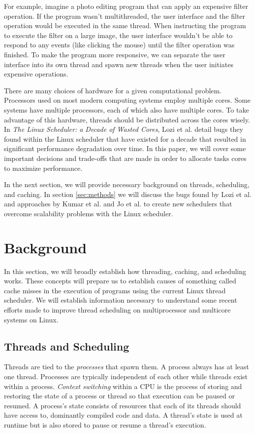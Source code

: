 \documentclass{sig-alternate}
\begin{document}
For example, imagine a photo editing program that can apply an expensive filter operation. If the program wasn't multithreaded, the user interface and the filter operation would be executed in the same thread. When instructing the program to execute the filter on a large image, the user interface wouldn't be able to respond to any events (like clicking the mouse) until the filter operation was finished. To make the program more responsive, we can separate the user interface into its own thread and spawn new threads when the user initiates expensive operations.

There are many choices of hardware for a given computational problem. Processors used on most modern computing systems employ multiple cores. Some systems have multiple processors, each of which also have multiple cores. To take advantage of this hardware, threads should be distributed across the cores wisely. In \emph{The Linux Scheduler: a Decade of Wasted Cores}, Lozi et al. detail bugs they found within the Linux scheduler that have existed for a decade that resulted in significant performance degradation over time. In this paper, we will cover some important decisions and trade-offs that are made in order to allocate tasks cores to maximize performance.

In the next section, we will provide necessary background on threads, scheduling, and caching. In section \ref{sec:methods} we will discuss the bugs found by Lozi et al. and approaches by Kumar et al. and Jo et al. to create new schedulers that overcome scalability problems with the Linux scheduler.
\section{Background}
\label{sec:bg}

In this section, we will broadly establish how threading, caching, and scheduling works. These concepts will prepare us to establish causes of something called cache misses in the execution of programs using the current Linux thread scheduler. We will establish information necessary to understand some recent efforts made to improve thread scheduling on multiprocessor and multicore systems on Linux.

\subsection{Threads and Scheduling}
\label{sec:threads}

Threads are tied to the \emph{processes} that spawn them. A process always has at least one thread. Processes are typically independent of each other while threads exist within a process. \emph{Context switching} within a CPU is the process of storing and restoring the state of a process or thread so that execution can be paused or resumed. A process's state consists of resources that each of its threads should have access to, dominantly compiled code and data. A thread's state is used at runtime but is also stored to pause or resume a thread's execution.
\end{document}
